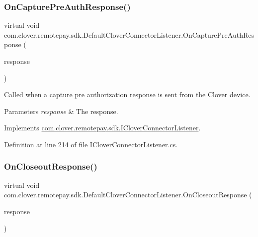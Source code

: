 \subsubsection{\texorpdfstring{On\+Capture\+Pre\+Auth\+Response()}{OnCapturePreAuthResponse()}}
{\footnotesize\ttfamily virtual void com.\+clover.\+remotepay.\+sdk.\+Default\+Clover\+Connector\+Listener.\+On\+Capture\+Pre\+Auth\+Response (\begin{DoxyParamCaption}\item[{\hyperlink{classcom_1_1clover_1_1remotepay_1_1sdk_1_1_capture_pre_auth_response}{Capture\+Pre\+Auth\+Response}}]{response }\end{DoxyParamCaption})\hspace{0.3cm}{\ttfamily [virtual]}}



Called when a capture pre authorization response is sent from the Clover device. 


\begin{DoxyParams}{Parameters}
{\em response} & The response.\\
\hline
\end{DoxyParams}


Implements \hyperlink{interfacecom_1_1clover_1_1remotepay_1_1sdk_1_1_i_clover_connector_listener_a1bc377474d004046068f80c5756b97da}{com.\+clover.\+remotepay.\+sdk.\+I\+Clover\+Connector\+Listener}.



Definition at line 214 of file I\+Clover\+Connector\+Listener.\+cs.

\mbox{\label{classcom_1_1clover_1_1remotepay_1_1sdk_1_1_default_clover_connector_listener_ae5a9a85a4807b9823869577a1d58d953}} 
\subsubsection{\texorpdfstring{On\+Closeout\+Response()}{OnCloseoutResponse()}}
{\footnotesize\ttfamily virtual void com.\+clover.\+remotepay.\+sdk.\+Default\+Clover\+Connector\+Listener.\+On\+Closeout\+Response (\begin{DoxyParamCaption}\item[{\hyperlink{classcom_1_1clover_1_1remotepay_1_1sdk_1_1_closeout_response}{Closeout\+Response}}]{response }\end{DoxyParamCaption})\hspace{0.3cm}{\ttfamily [virtual]}}



